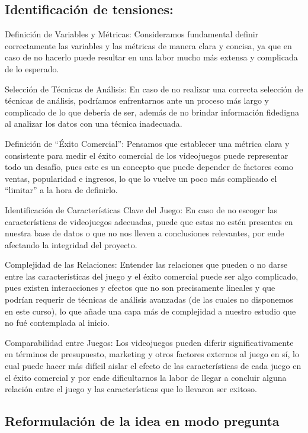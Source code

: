 \documentclass[
  letterpaper,
  DIV=11,
  numbers=noendperiod]{scrreprt}
\begin{document}
\hypertarget{identificaciuxf3n-de-tensiones}{%
\subsection{Identificación de
tensiones:}\label{identificaciuxf3n-de-tensiones}}

Definición de Variables y Métricas: Consideramos fundamental definir
correctamente las variables y las métricas de manera clara y concisa, ya
que en caso de no hacerlo puede resultar en una labor mucho más extensa
y complicada de lo esperado.

Selección de Técnicas de Análisis: En caso de no realizar una correcta
selección de técnicas de análisis, podríamos enfrentarnos ante un
proceso más largo y complicado de lo que debería de ser, además de no
brindar información fidedigna al analizar los datos con una técnica
inadecuada.

Definición de ``Éxito Comercial'': Pensamos que establecer una métrica
clara y consistente para medir el éxito comercial de los videojuegos
puede representar todo un desafío, pues este es un concepto que puede
depender de factores como ventas, popularidad e ingresos, lo que lo
vuelve un poco más complicado el ``limitar'' a la hora de definirlo.

Identificación de Características Clave del Juego: En caso de no escoger
las características de videojuegos adecuadas, puede que estas no estén
presentes en nuestra base de datos o que no nos lleven a conclusiones
relevantes, por ende afectando la integridad del proyecto.

Complejidad de las Relaciones: Entender las relaciones que pueden o no
darse entre las características del juego y el éxito comercial puede ser
algo complicado, pues existen interacciones y efectos que no son
precisamente lineales y que podrían requerir de técnicas de análisis
avanzadas (de las cuales no disponemos en este curso), lo que añade una
capa más de complejidad a nuestro estudio que no fué contemplada al
inicio.

Comparabilidad entre Juegos: Los videojuegos pueden diferir
significativamente en términos de presupuesto, marketing y otros
factores externos al juego en sí, lo cual puede hacer más difícil aislar
el efecto de las características de cada juego en el éxito comercial y
por ende dificultarnos la labor de llegar a concluir alguna relación
entre el juego y las características que lo llevaron ser exitoso.

\hypertarget{reformulaciuxf3n-de-la-idea-en-modo-pregunta}{%
\subsection{Reformulación de la idea en modo
pregunta}\label{reformulaciuxf3n-de-la-idea-en-modo-pregunta}}
\end{document}
